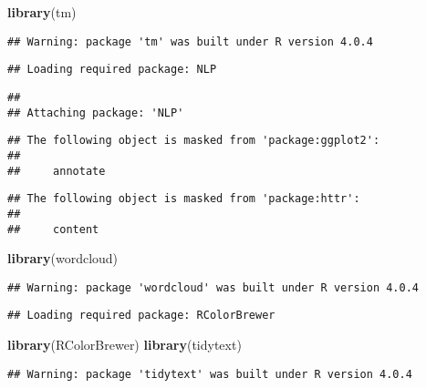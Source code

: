 \documentclass[
]{article}
\newenvironment{Shaded}{\begin{snugshade}}{\end{snugshade}}
\newcommand{\KeywordTok}[1]{\textcolor[rgb]{0.13,0.29,0.53}{\textbf{#1}}}
\newcommand{\NormalTok}[1]{#1}
\begin{document}
\begin{Shaded}
\begin{Highlighting}[]
\KeywordTok{library}\NormalTok{(tm)}
\end{Highlighting}
\end{Shaded}

\begin{verbatim}
## Warning: package 'tm' was built under R version 4.0.4
\end{verbatim}

\begin{verbatim}
## Loading required package: NLP
\end{verbatim}

\begin{verbatim}
## 
## Attaching package: 'NLP'
\end{verbatim}

\begin{verbatim}
## The following object is masked from 'package:ggplot2':
## 
##     annotate
\end{verbatim}

\begin{verbatim}
## The following object is masked from 'package:httr':
## 
##     content
\end{verbatim}

\begin{Shaded}
\begin{Highlighting}[]
\KeywordTok{library}\NormalTok{(wordcloud)}
\end{Highlighting}
\end{Shaded}

\begin{verbatim}
## Warning: package 'wordcloud' was built under R version 4.0.4
\end{verbatim}

\begin{verbatim}
## Loading required package: RColorBrewer
\end{verbatim}

\begin{Shaded}
\begin{Highlighting}[]
\KeywordTok{library}\NormalTok{(RColorBrewer)}
\KeywordTok{library}\NormalTok{(tidytext)}
\end{Highlighting}
\end{Shaded}

\begin{verbatim}
## Warning: package 'tidytext' was built under R version 4.0.4
\end{verbatim}
\end{document}
